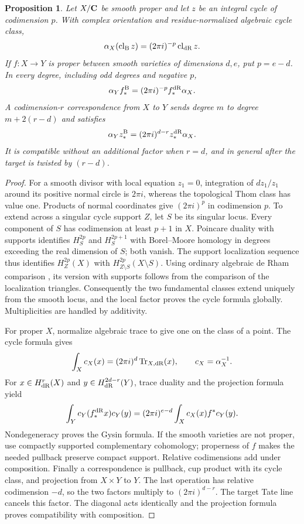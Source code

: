 \documentclass[11pt]{article}
\newtheorem{proposition}[theorem]{Proposition}
\theoremstyle{definition}\newtheorem{definition}[theorem]{Definition}
\theoremstyle{remark}\newtheorem{remark}[theorem]{Remark}
\begin{document}
\begin{proposition}\label{prop:cycle-normalization}
Let $X/\mathbf C$ be smooth proper and let $z$ be an integral cycle of codimension $p$. With complex orientation and residue-normalized algebraic cycle class,
\[
 \alpha_X(\operatorname{cl}_{\mathrm B}z)
          =(2\pi i)^{-p}\operatorname{cl}_{\mathrm{dR}}z.
\]
If $f:X\to Y$ is proper between smooth varieties of dimensions $d,e$, put $p=e-d$. In every degree, including odd degrees and negative $p$,
\[
 \alpha_Y f_*^{\mathrm B}=(2\pi i)^{-p}f_*^{\mathrm{dR}}\alpha_X.
\]
A codimension-$r$ correspondence from $X$ to $Y$ sends degree $m$ to degree $m+2(r-d)$ and satisfies
\[
                \alpha_Y z_*^{\mathrm B}=(2\pi i)^{d-r}z_*^{\mathrm{dR}}\alpha_X.
\]
It is compatible without an additional factor when $r=d$, and in general after the target is twisted by $(r-d)$.
\end{proposition}
\begin{proof}
For a smooth divisor with local equation $z_1=0$, integration of $dz_1/z_1$ around its positive normal circle is $2\pi i$, whereas the topological Thom class has value one. Products of normal coordinates give $(2\pi i)^p$ in codimension $p$. To extend across a singular cycle support $Z$, let $S$ be its singular locus. Every component of $S$ has codimension at least $p+1$ in $X$. Poincare duality with supports identifies $H_S^{2p}$ and $H_S^{2p+1}$ with Borel--Moore homology in degrees exceeding the real dimension of $S$; both vanish. The support localization sequence thus identifies $H_Z^{2p}(X)$ with $H_{Z\setminus S}^{2p}(X\setminus S)$. Using ordinary algebraic de Rham comparison \cite[Theorems 1 and 1', pp.~95--96]{GrothendieckDeRham}, its version with supports follows from the comparison of the localization triangles. Consequently the two fundamental classes extend uniquely from the smooth locus, and the local factor proves the cycle formula globally. Multiplicities are handled by additivity.

For proper $X$, normalize algebraic trace to give one on the class of a point. The cycle formula gives
\[
 \int_X c_X(x)=(2\pi i)^d\operatorname{Tr}_{X,\mathrm{dR}}(x),\qquad c_X=\alpha_X^{-1}.
\]
For $x\in H^r_{\mathrm{dR}}(X)$ and $y\in H^{2d-r}_{\mathrm{dR}}(Y)$, trace duality and the projection formula yield
\[
 \int_Y c_Y(f_*^{\mathrm{dR}}x)c_Y(y)
   =(2\pi i)^{e-d}\int_X c_X(x)f^*c_Y(y).
\]
Nondegeneracy proves the Gysin formula. If the smooth varieties are not proper, use compactly supported complementary cohomology; properness of $f$ makes the needed pullback preserve compact support. Relative codimensions add under composition. Finally a correspondence is pullback, cup product with its cycle class, and projection from $X\times Y$ to $Y$. The last operation has relative codimension $-d$, so the two factors multiply to $(2\pi i)^{d-r}$. The target Tate line cancels this factor. The diagonal acts identically and the projection formula proves compatibility with composition.
\end{proof}
\end{document}
